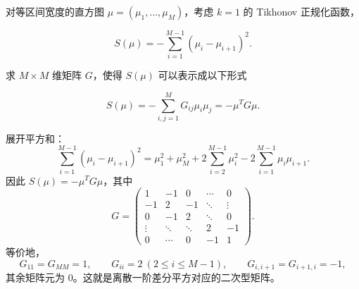 \begin{question}
对等区间宽度的直方图 \(\mu=(\mu_1,\ldots,\mu_M)\)，考虑 \(k=1\) 的
Tikhonov 正规化函数，

\[
S(\mu)=-\sum_{i=1}^{M-1}(\mu_i-\mu_{i+1})^2.
\]

求 \(M\times M\) 维矩阵 \(G\)，使得 \(S(\mu)\) 可以表示成以下形式

\[
S(\mu)=-\sum_{i,j=1}^{M}G_{ij}\mu_i\mu_j=-\mu^T G\mu.
\]
\begin{solution}
展开平方和：
\[
\sum_{i=1}^{M-1}(\mu_i-\mu_{i+1})^2
=\mu_1^2+\mu_M^2+2\sum_{i=2}^{M-1}\mu_i^2
-2\sum_{i=1}^{M-1}\mu_i\mu_{i+1}.
\]
因此 \(S(\mu)=-\mu^T G\mu\)，其中
\[
G=
\begin{pmatrix}
1 & -1 & 0 & \cdots & 0\\
-1 & 2 & -1 & \ddots & \vdots\\
0 & -1 & 2 & \ddots & 0\\
\vdots & \ddots & \ddots & 2 & -1\\
0 & \cdots & 0 & -1 & 1
\end{pmatrix}.
\]
等价地，
\[
G_{11}=G_{MM}=1,\qquad
G_{ii}=2\ (2\le i\le M-1),\qquad
G_{i,i+1}=G_{i+1,i}=-1,
\]
其余矩阵元为 \(0\)。这就是离散一阶差分平方对应的二次型矩阵。
\end{solution}
\end{question}


